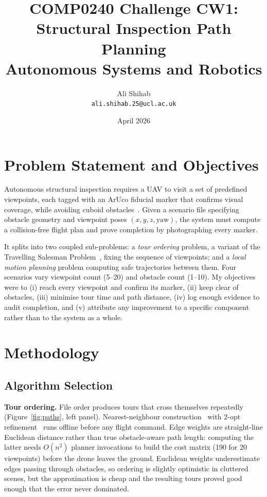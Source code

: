 \documentclass[11pt,a4paper]{article}
\title{\textbf{COMP0240 Challenge CW1: Structural Inspection Path Planning}\\
\large Autonomous Systems and Robotics}
\author{Ali Shihab \\ \texttt{ali.shihab.25@ucl.ac.uk}}
\date{April 2026}
\begin{document}
\maketitle

\section{Problem Statement and Objectives}

Autonomous structural inspection requires a UAV to visit a set of predefined viewpoints, each tagged with an ArUco fiducial marker that confirms visual coverage, while avoiding cuboid obstacles~\cite{bircher2015structural}. Given a scenario file specifying obstacle geometry and viewpoint poses $(x, y, z, \text{yaw})$, the system must compute a collision-free flight plan and prove completion by photographing every marker.

It splits into two coupled sub-problems: a \emph{tour ordering} problem, a variant of the Travelling Salesman Problem~\cite{lawler1985travelling}, fixing the sequence of viewpoints; and a \emph{local motion planning} problem computing safe trajectories between them. Four scenarios vary viewpoint count (5--20) and obstacle count (1--10). My objectives were to (i) reach every viewpoint and confirm its marker, (ii) keep clear of obstacles, (iii) minimise tour time and path distance, (iv) log enough evidence to audit completion, and (v) attribute any improvement to a specific component rather than to the system as a whole.

\section{Methodology}

\subsection{Algorithm Selection}

\textbf{Tour ordering.} File order produces tours that cross themselves repeatedly (Figure~\ref{fig:paths}, left panel). Nearest-neighbour construction~\cite{lawler1985travelling} with 2-opt refinement~\cite{croes1958method} runs offline before any flight command. Edge weights are straight-line Euclidean distance rather than true obstacle-aware path length: computing the latter needs $O(n^2)$ planner invocations to build the cost matrix (190 for 20 viewpoints) before the drone leaves the ground. Euclidean weights underestimate edges passing through obstacles, so ordering is slightly optimistic in cluttered scenes, but the approximation is cheap and the resulting tours proved good enough that the error never dominated.
\end{document}
